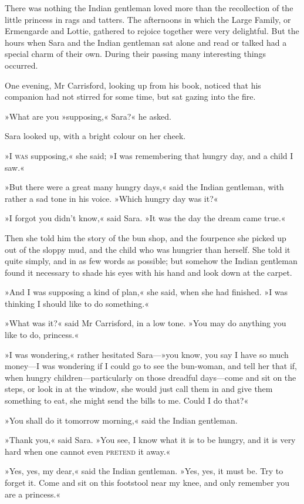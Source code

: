 There was nothing the Indian gentleman loved more than the recollection of the little princess in rags and tatters. The afternoons in which the Large Family, or Ermengarde and Lottie, gathered to rejoice together were very delightful. But the hours when Sara and the Indian gentleman sat alone and read or talked had a special charm of their own. During their passing many interesting things occurred.

One evening, Mr Carrisford, looking up from his book, noticed that his companion had not stirred for some time, but sat gazing into the fire.

»What are you »supposing,« Sara?« he asked.

Sara looked up, with a bright colour on her cheek.

»I \textsc{was} supposing,« she said; »I was remembering that hungry day, and a child I saw.«

»But there were a great many hungry days,« said the Indian gentleman, with rather a sad tone in his voice. »Which hungry day was it?«

»I forgot you didn't know,« said Sara. »It was the day the dream came true.«

Then she told him the story of the bun shop, and the fourpence she picked up out of the sloppy mud, and the child who was hungrier than herself. She told it quite simply, and in as few words as possible; but somehow the Indian gentleman found it necessary to shade his eyes with his hand and look down at the carpet.

»And I was supposing a kind of plan,« she said, when she had finished. »I was thinking I should like to do something.«

»What was it?« said Mr Carrisford, in a low tone. »You may do anything you like to do, princess.«

»I was wondering,« rather hesitated Sara—»you know, you say I have so much money—I was wondering if I could go to see the bun-woman, and tell her that if, when hungry children—particularly on those dreadful days—come and sit on the steps, or look in at the window, she would just call them in and give them something to eat, she might send the bills to me. Could I do that?«

»You shall do it tomorrow morning,« said the Indian gentleman.

»Thank you,« said Sara. »You see, I know what it is to be hungry, and it is very hard when one cannot even \textsc{pretend} it away.«

»Yes, yes, my dear,« said the Indian gentleman. »Yes, yes, it must be. Try to forget it. Come and sit on this footstool near my knee, and only remember you are a princess.«

